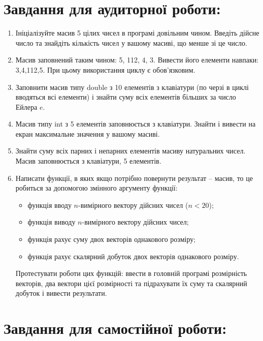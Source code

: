 \documentclass[a5paper,titlepage,openany,twoside,
]
{book_unv}%
\begin{document}
\section{Завдання для аудиторної роботи:}

\begin{enumerate}
\def\labelenumi{\arabic{enumi})}
\item
  Ініціалізуйте масив 5 цілих чисел в програмі довільним чином. Введіть
  дійсне число та знайдіть кількість чисел у вашому масиві, що менше зі
  це число.

\item
  Масив заповнений таким чином: 5, 112, 4, 3. Вивести його елементи
  навпаки: 3,4,112,5. При цьому використання циклу є обов'язковим.
\item
  Заповнити масив типу double з 10 елементів з клавіатури (по черзі в
  циклі вводяться всі елементи) і знайти суму всіх елементів більших за
  число Ейлера \(e\).
\item
  Масив типу int з 5 елементів заповнюється з клавіатури. Знайти і
  вивести на екран максимальне значення у вашому масиві.
\item
  Знайти суму всіх парних і непарних елементів масиву натуральних чисел.
  Масив заповнюється з клавіатури, 5 елементів.
\item
Написати функції, в яких якщо потрібно повернути результат -- масив, 
то це робиться за допомогою змінного аргументу функції:
\begin{itemize}
\item функція вводу $n$-вимірного вектору дійсних чисел ($n<20$);
\item функція виводу $n$-вимірного вектору дійсних чисел;
\item функція рахує суму двох векторів однакового розміру;
\item функція рахує скалярний добуток двох векторів однакового розміру.
 \end{itemize}
Протестувати роботи цих функцій: ввести в головній програмі розмірність
векторів, два вектори цієї розмірності та підрахувати їх суму та скалярний
добуток і вивести результати. 
\end{enumerate}

\section{Завдання для самостійної роботи:}
\end{document}

